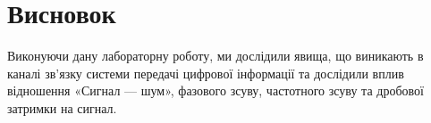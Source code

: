 \documentclass[
	a4paper,
	oneside,
	BCOR = 10mm,
	DIV = 12,
	12pt,
	headings = normal,
]{scrartcl}
\begin{document}
	\section{Висновок}
		Виконуючи дану лабораторну роботу, ми дослідили явища, що виникають в каналі зв'язку системи передачі цифрової інформації та дослідили вплив відношення «Сигнал — шум», фазового зсуву, частотного зсуву та дробової затримки на сигнал.
\end{document}

